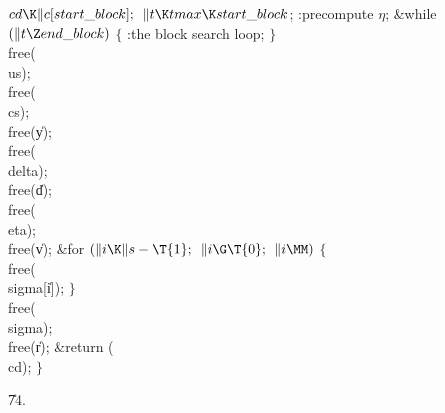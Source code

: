 ${}\\{cd}\K\|c[\\{start\_block}];{}$\6
${}\|t\K\\{tmax}\K\\{start\_block}{}$;\6
:precompute $\eta$\X;\6
\&{while} ${}(\|t\Z\\{end\_block}){}$\5
${}\{{}$\1\6
:the block search loop\X;\6
\4${}\}{}$\2\6
\\{free}(\\{us});\6
\\{free}(\\{cs});\6
\\{free}(\|y);\6
\\{free}(\\{delta});\6
\\{free}(\|d);\6
\\{free}(\\{eta});\6
\\{free}(\|v);\6
\&{for} ${}(\|i\K\|s-\T{1};{}$ ${}\|i\G\T{0};{}$ ${}\|i\MM){}$\5
${}\{{}$\1\6
\\{free}(\\{sigma}[\|i]);\6
\4${}\}{}$\2\6
\\{free}(\\{sigma});\6
\\{free}(\|r);\6
\&{return} (\\{cd});\6
\4${}\}{}$\2\par
\U74.\fi

